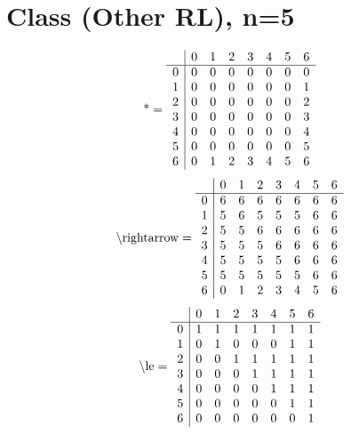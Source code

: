 \documentclass[11pt]{article}
\begin{document}
\section{Class (Other RL), n=5}
\[\text{*} = 
\begin{array}{r | r r r r r r r}
 & 0 & 1 & 2 & 3 & 4 & 5 & 6 \\ \hline
0 & 0 & 0 & 0 & 0 & 0 & 0 & 0 \\
1 & 0 & 0 & 0 & 0 & 0 & 0 & 1 \\
2 & 0 & 0 & 0 & 0 & 0 & 0 & 2 \\
3 & 0 & 0 & 0 & 0 & 0 & 0 & 3 \\
4 & 0 & 0 & 0 & 0 & 0 & 0 & 4 \\
5 & 0 & 0 & 0 & 0 & 0 & 0 & 5 \\
6 & 0 & 1 & 2 & 3 & 4 & 5 & 6 \\
\end{array}
\]
\[\text{\textbackslash rightarrow} = 
\begin{array}{r | r r r r r r r}
 & 0 & 1 & 2 & 3 & 4 & 5 & 6 \\ \hline
0 & 6 & 6 & 6 & 6 & 6 & 6 & 6 \\
1 & 5 & 6 & 5 & 5 & 5 & 6 & 6 \\
2 & 5 & 5 & 6 & 6 & 6 & 6 & 6 \\
3 & 5 & 5 & 5 & 6 & 6 & 6 & 6 \\
4 & 5 & 5 & 5 & 5 & 6 & 6 & 6 \\
5 & 5 & 5 & 5 & 5 & 5 & 6 & 6 \\
6 & 0 & 1 & 2 & 3 & 4 & 5 & 6 \\
\end{array}
\]
\[\text{\textbackslash le} = 
\begin{array}{r | r r r r r r r}
 & 0 & 1 & 2 & 3 & 4 & 5 & 6 \\ \hline
0 & 1 & 1 & 1 & 1 & 1 & 1 & 1 \\
1 & 0 & 1 & 0 & 0 & 0 & 1 & 1 \\
2 & 0 & 0 & 1 & 1 & 1 & 1 & 1 \\
3 & 0 & 0 & 0 & 1 & 1 & 1 & 1 \\
4 & 0 & 0 & 0 & 0 & 1 & 1 & 1 \\
5 & 0 & 0 & 0 & 0 & 0 & 1 & 1 \\
6 & 0 & 0 & 0 & 0 & 0 & 0 & 1 \\
\end{array}
\]
\end{document}
